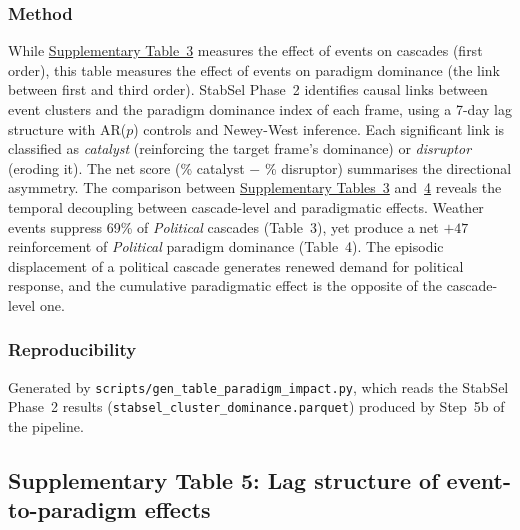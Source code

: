 

\subsubsection*{Method}
While \hyperref[tab:si_event_frame]{Supplementary Table~3} measures the effect of events on cascades (first order), this table measures the effect of events on paradigm dominance (the link between first and third order). StabSel Phase~2 identifies causal links between event clusters and the paradigm dominance index of each frame, using a 7-day lag structure with AR($p$) controls and Newey-West inference. Each significant link is classified as \emph{catalyst} (reinforcing the target frame's dominance) or \emph{disruptor} (eroding it). The net score (\% catalyst $-$ \% disruptor) summarises the directional asymmetry. The comparison between \hyperref[tab:si_event_frame]{Supplementary Tables~3} and~\hyperref[tab:si_paradigm_impact]{4} reveals the temporal decoupling between cascade-level and paradigmatic effects. Weather events suppress 69\% of \emph{Political} cascades (Table~3), yet produce a net $+47$ reinforcement of \emph{Political} paradigm dominance (Table~4). The episodic displacement of a political cascade generates renewed demand for political response, and the cumulative paradigmatic effect is the opposite of the cascade-level one.

\subsubsection*{Reproducibility}
Generated by \texttt{scripts/gen\_table\_paradigm\_impact.py}, which reads the StabSel Phase~2 results (\texttt{stabsel\_cluster\_dominance.parquet}) produced by Step~5b of the pipeline.


\newpage
\subsection*{Supplementary Table 5: Lag structure of event-to-paradigm effects}



